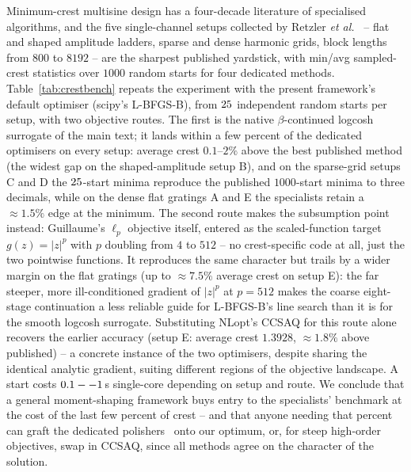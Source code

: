 \documentclass[10pt,a4paper]{article}
\numberwithin{equation}{section}
\newcommand{\abs}[1]{\left|#1\right|}
\newcommand{\mat}[1]{\left(#1\right)}
\begin{document}
Minimum-crest multisine design has a four-decade literature of specialised algorithms, and the five single-channel setups collected by Retzler \emph{et al.}~\cite{retzler2022crest} -- flat and shaped amplitude ladders, sparse and dense harmonic grids, block lengths from $800$ to $8192$ -- are the sharpest published yardstick, with min/avg sampled-crest statistics over $1000$ random starts for four dedicated methods. Table~\ref{tab:crestbench} repeats the experiment with the present framework's default optimiser (scipy's L-BFGS-B), from $25$ independent random starts per setup, with two objective routes. The first is the native $\beta$-continued logcosh surrogate of the main text; it lands within a few percent of the dedicated optimisers on every setup: average crest $0.1$--$2\%$ above the best published method (the widest gap on the shaped-amplitude setup B), and on the sparse-grid setups C and D the $25$-start minima reproduce the published $1000$-start minima to three decimals, while on the dense flat gratings A and E the specialists retain a ${\approx}1.5\%$ edge at the minimum. The second route makes the subsumption point instead: Guillaume's $\ell_p$ objective itself, entered as the scaled-function target $g\mat{z}=\abs{z}^p$ with $p$ doubling from $4$ to $512$ -- no crest-specific code at all, just the two pointwise functions. It reproduces the same character but trails by a wider margin on the flat gratings (up to ${\approx}7.5\%$ average crest on setup E): the far steeper, more ill-conditioned gradient of $|z|^p$ at $p=512$ makes the coarse eight-stage continuation a less reliable guide for L-BFGS-B's line search than it is for the smooth logcosh surrogate. Substituting NLopt's CCSAQ for this route alone recovers the earlier accuracy (setup E: average crest $1.3928$, ${\approx}1.8\%$ above published) -- a concrete instance of the two optimisers, despite sharing the identical analytic gradient, suiting different regions of the objective landscape. A start costs $0.1--1\,$s single-core depending on setup and route. We conclude that a general moment-shaping framework buys entry to the specialists' benchmark at the cost of the last few percent of crest -- and that anyone needing that percent can graft the dedicated polishers~\cite{guillaume1991crest,retzler2022crest} onto our optimum, or, for steep high-order objectives, swap in CCSAQ, since all methods agree on the character of the solution.
\end{document}
